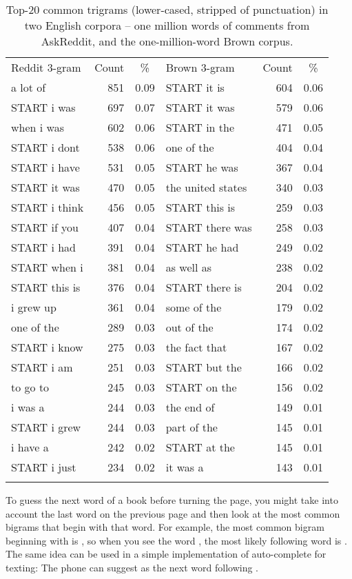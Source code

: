 \begin{table}
\begin{tabular}{lrc  lrc}
\lsptoprule
{Reddit 3-gram} & {Count} & {\%} & {Brown 3-gram} & {Count} & {\%}  \\\cmidrule(r){1-3} \cmidrule(l){4-6} 
a lot of & 851 & 0.09 & START it is & 604 & 0.06 \\
START i was & 697 & 0.07 & START it was & 579 & 0.06 \\
when i was & 602 & 0.06 & START in the & 471 & 0.05 \\
START i dont & 538 & 0.06 & one of the & 404 & 0.04 \\
START i have & 531 & 0.05 & START he was & 367 & 0.04 \\
START it was & 470 & 0.05 & the united states & 340 & 0.03 \\
START i think & 456 & 0.05 & START this is & 259 & 0.03 \\
START if you & 407 & 0.04 & START there was & 258 & 0.03 \\
START i had & 391 & 0.04 & START he had & 249 & 0.02 \\
START when i & 381 & 0.04 & as well as & 238 & 0.02 \\
START this is & 376 & 0.04 & START there is & 204 & 0.02 \\
i grew up & 361 & 0.04 & some of the & 179 & 0.02 \\
one of the & 289 & 0.03 & out of the & 174 & 0.02 \\
START i know & 275 & 0.03 & the fact that & 167 & 0.02 \\
START i am & 251 & 0.03 & START but the & 166 & 0.02 \\
to go to & 245 & 0.03 & START on the & 156 & 0.02 \\
i was a & 244 & 0.03 & the end of & 149 & 0.01 \\
START i grew & 244 & 0.03 & part of the & 145 & 0.01 \\
i have a & 242 & 0.02 & START at the & 145 & 0.01 \\
START i just & 234 & 0.02 & it was a & 143 & 0.01 \\
\lspbottomrule
\end{tabular}
\caption{Top-20 common trigrams (lower-cased, stripped of punctuation) in two English corpora -- one million words of comments from AskReddit, and the one-million-word Brown corpus.}
\label{fig:3grams}
\end{table}



To guess the next word of a book before turning the page, you might take into account the last word on the previous page and then look at the most common bigrams that begin with that word.  For example, the most common bigram beginning with  is , so when you see the word , the most likely following word is . The same idea can be used in a simple implementation of auto-complete for texting: The phone can suggest  as the next word following .

